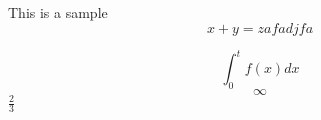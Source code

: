 \documentclass{article}
\begin{document}
This is a sample
\begin{equation}
    x + y = zafadjfa
\end{equation}


$$
\int_0^t f(x) dx
$$
\[
    \infty
\]
$\frac{2}{3}$
\cite{KyTea}



\end{document}
